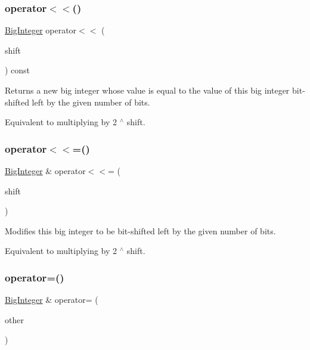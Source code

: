 \subsubsection{\texorpdfstring{operator$<$$<$()}{operator<<()}}
{\footnotesize\ttfamily \mbox{\hyperlink{classBigInteger}{Big\+Integer}} operator$<$$<$ (\begin{DoxyParamCaption}\item[{unsigned int}]{shift }\end{DoxyParamCaption}) const}



Returns a new big integer whose value is equal to the value of this big integer bit-\/shifted left by the given number of bits. 

Equivalent to multiplying by 2 $^\wedge$ shift. \mbox{\label{classBigInteger_a339098d3b2c04e1bd7bf883e460f5aea}} 
\subsubsection{\texorpdfstring{operator$<$$<$=()}{operator<<=()}}
{\footnotesize\ttfamily \mbox{\hyperlink{classBigInteger}{Big\+Integer}} \& operator$<$$<$= (\begin{DoxyParamCaption}\item[{unsigned int}]{shift }\end{DoxyParamCaption})}



Modifies this big integer to be bit-\/shifted left by the given number of bits. 

Equivalent to multiplying by 2 $^\wedge$ shift. \mbox{\label{classBigInteger_ac2c411cecad98a599e38ad10f1e27e45}} 
\subsubsection{\texorpdfstring{operator=()}{operator=()}}
{\footnotesize\ttfamily \mbox{\hyperlink{classBigInteger}{Big\+Integer}} \& operator= (\begin{DoxyParamCaption}\item[{const \mbox{\hyperlink{classBigInteger}{Big\+Integer}} \&}]{other }\end{DoxyParamCaption})}



